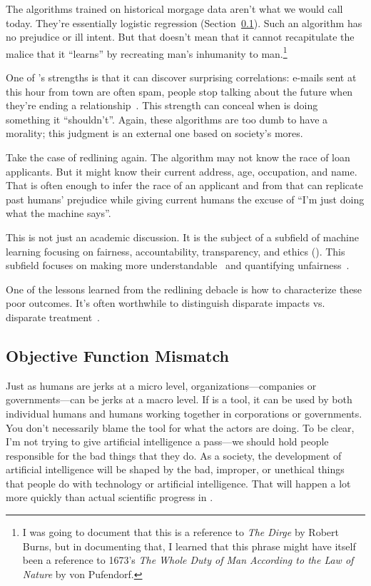 The algorithms trained on historical morgage data aren't what we would call  today.  They're essentially logistic regression (Section~\ref{}).
%
Such an algorithm has no prejudice or ill intent.  But that doesn't
mean that it cannot recapitulate the malice that it ``learns'' by
recreating man's inhumanity to man.\footnote{I was going to document
  that this is a reference to \textit{The Dirge} by Robert Burns, but
  in documenting that, I learned that this phrase might have itself
  been a reference to 1673's \textit{The Whole Duty of Man According
    to the Law of Nature} by von Pufendorf.}

One of 's strengths is that it can discover surprising
correlations: e-mails sent at this hour from town are often spam,
people stop talking about the future when they're ending a
relationship~\cite{}.  This strength can conceal when  is
doing something it ``shouldn't''. Again, these algorithms are too dumb
to have a morality; this judgment is an external one based on
society's mores.

Take the case of redlining again.  The algorithm may not know the race
of loan applicants.  But it might know their current address, age,
occupation, and name.  That is often enough to infer the race of an
applicant and from that can replicate past humans' prejudice while
giving current humans the excuse of ``I'm just doing what the machine
says''.

This is not just an academic discussion.  It is the subject of a
subfield of machine learning focusing on fairness, accountability,
transparency, and ethics ().
%
This subfield focuses on making  more
understandable~\citep{DoshiVelez-17} and quantifying
unfairness~\citep{speicher-18}.

One of the lessons learned from the redlining debacle is how to
characterize these poor outcomes.  It's often worthwhile to
distinguish disparate impacts vs. disparate
treatment~\citep{hillier-03}.

\subsection{Objective Function Mismatch}

Just as humans are jerks at a micro level, organizations---companies
or governments---can be jerks at a macro level. If  is a tool,
it can be used by both individual humans and humans working together
in corporations or governments. You don't necessarily blame the tool
for what the actors are doing. To be clear, I'm not trying to give
artificial intelligence a pass—we should hold people responsible for
the bad things that they do. As a society, the development of
artificial intelligence will be shaped by the bad, improper, or
unethical things that people do with technology or artificial
intelligence. That will happen a lot more quickly than actual
scientific progress in .

